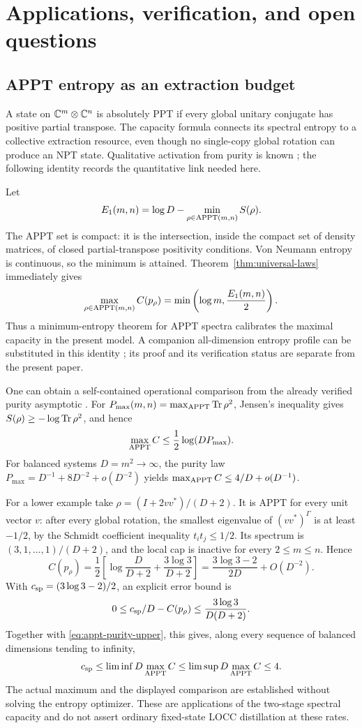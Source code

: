 \section{Applications, verification, and open questions}\label{sec:applications}

\subsection{APPT entropy as an extraction budget}
A state on $\mathbb C^m\otimes\mathbb C^n$ is absolutely PPT if every global unitary conjugate has positive partial transpose. The capacity formula connects its spectral entropy to a collective extraction resource, even though no single-copy global rotation can produce an NPT state. Qualitative activation from purity is known \cite{kondra}; the following identity records the quantitative link needed here.

Let
\[
 E_1(m,n)=\log D-\min_{\rho\in\mathrm{APPT}(m,n)}S(\rho).
\]
The APPT set is compact: it is the intersection, inside the compact set of density matrices, of closed partial-transpose positivity conditions. Von Neumann entropy is continuous, so the minimum is attained. Theorem~\ref{thm:universal-laws} immediately gives
\begin{equation}\label{eq:appt-capacity}
 \max_{\rho\in\mathrm{APPT}(m,n)}C(p_\rho)
 =\min\left(\log m,\frac{E_1(m,n)}2\right).
\end{equation}
Thus a minimum-entropy theorem for APPT spectra calibrates the maximal capacity in the present model. A companion all-dimension entropy profile can be substituted in this identity \cite{zhang-appt-entropy}; its proof and its verification status are separate from the present paper.

One can obtain a self-contained operational comparison from the already verified purity asymptotic \cite{zhang-appt-purity}. For $P_{\max}(m,n)=\max_{\mathrm{APPT}}\operatorname{Tr}\rho^2$, Jensen's inequality gives $S(\rho)\ge-\log\operatorname{Tr}\rho^2$, and hence
\begin{equation}\label{eq:appt-purity-upper}
 \max_{\mathrm{APPT}}C\le\frac12\log(DP_{\max}).
\end{equation}
For balanced systems $D=m^2\to\infty$, the purity law $P_{\max}=D^{-1}+8D^{-2}+o(D^{-2})$ yields $\max_{\mathrm{APPT}}C\le4/D+o(D^{-1})$.

For a lower example take $\rho=(I+2vv^*)/(D+2)$. It is APPT for every unit vector $v$: after every global rotation, the smallest eigenvalue of $(vv^*)^\Gamma$ is at least $-1/2$, by the Schmidt coefficient inequality $t_it_j\le1/2$. Its spectrum is $(3,1,\ldots,1)/(D+2)$, and the local cap is inactive for every $2\le m\le n$. Hence
\[
 C(p_\rho)=\frac12\left[\log\frac D{D+2}+\frac{3\log3}{D+2}\right]
 =\frac{3\log3-2}{2D}+O(D^{-2}).
\]
With $c_{\rm sp}=(3\log3-2)/2$, an explicit error bound is
\[
 0\le c_{\rm sp}/D-C(p_\rho)\le\frac{3\log3}{D(D+2)}.
\]
Together with \eqref{eq:appt-purity-upper}, this gives, along every sequence of balanced dimensions tending to infinity,
\[
 c_{\rm sp}\le\liminf D\max_{\mathrm{APPT}}C
 \le\limsup D\max_{\mathrm{APPT}}C\le4.
\]
The actual maximum and the displayed comparison are established without solving the entropy optimizer. These are applications of the two-stage spectral capacity and do not assert ordinary fixed-state LOCC distillation at these rates.

